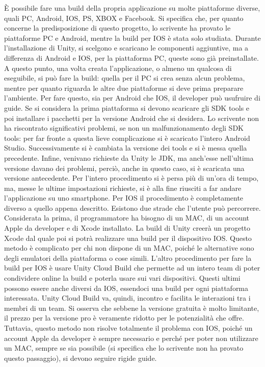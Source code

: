 È possibile fare una build della propria applicazione su molte piattaforme diverse, quali PC, Android, IOS, PS, XBOX e Facebook. Si specifica che, per quanto concerne la predisposizione di questo progetto, lo scrivente ha provato le piattaforme PC e Android, mentre la build per IOS è stata solo studiata.
Durante l’installazione di Unity, si scelgono e scaricano le componenti aggiuntive, ma a differenza di Android e IOS, per la piattaforma PC, queste sono già preinstallate.
A questo punto, una volta creata l’applicazione, o almeno un qualcosa di eseguibile, si può fare la build: quella per il PC si crea senza alcun problema, mentre per quanto riguarda le altre due piattaforme si deve prima preparare l’ambiente. Per fare questo, sia per Android che IOS, il developer può usufruire di guide.
Se si considera la prima piattaforma si devono scaricare gli SDK tools e poi installare i pacchetti per la versione Android che si desidera. Lo scrivente non ha riscontrato significativi problemi, se non un malfunzionamento degli SDK tools: per far fronte a questa lieve complicazione si è scaricato l’intero Android Studio. Successivamente si è cambiata la versione dei tools e si è messa quella precedente. Infine, venivano richieste da Unity le JDK, ma anch’esse nell’ultima versione davano dei problemi, perciò, anche in questo caso, si è scaricata una versione antecedente. Per l’intero procedimento si è persa più di un’ora di tempo, ma, messe le ultime impostazioni richieste, si è alla fine riusciti a far andare l’applicazione su uno smartphone.
Per IOS il procedimento è completamente diverso a quello appena descritto. Esistono due strade che l’utente può percorrere.
Considerata la prima, il programmatore ha bisogno di un MAC, di un account Apple da developer e di Xcode installato. La build di Unity creerà un progetto Xcode dal quale poi si potrà realizzare una build per il dispositivo IOS. Questo metodo è complicato per chi non dispone di un MAC, poiché le alternative sono degli emulatori della piattaforma o cose simili.
L’altro procedimento per fare la build per IOS è usare Unity Cloud Build che permette ad un intero team di poter condividere online la build e poterla usare sui vari dispositivi. Questi ultimi possono essere anche diversi da IOS, essendoci una build per ogni piattaforma interessata. Unity Cloud Build va, quindi, incontro e facilita le interazioni tra i membri di un team. Si osserva che sebbene la versione gratuita è molto limitante, il prezzo per la versione pro è veramente ridotto per le potenzialità che offre. Tuttavia, questo metodo non risolve totalmente il problema con IOS, poiché un account Apple da developer è sempre necessario e perché per poter non utilizzare un MAC, sempre se sia possibile (si specifica che lo scrivente non ha provato questo passaggio), si devono seguire rigide guide.


